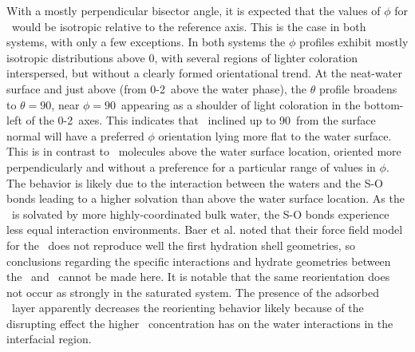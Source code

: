 
 With a mostly perpendicular bisector angle, it is expected that the values of $\phi$ for \suldiox~would be isotropic relative to the reference axis. This is the case in both systems, with only a few exceptions. In both systems the $\phi$ profiles exhibit mostly isotropic distributions above 0\angs, with several regions of lighter coloration interspersed, but without a clearly formed orientational trend. At the neat-water surface and just above (from 0-2\angs~above the water phase), the $\theta$ profile broadens to $\theta = 90$\textdegree, near $\phi = 90$\textdegree~appearing as a shoulder of light coloration in the bottom-left of the 0-2\angs~axes. This indicates that \suldiox~inclined up to 90\textdegree~from the surface normal will have a preferred $\phi$ orientation lying more flat to the water surface. This is in contrast to \suldiox~molecules above the water surface location, oriented more perpendicularly and without a preference for a particular range of values in $\phi$. The behavior is likely due to the interaction between the waters and the S-O bonds leading to a higher solvation than above the water surface location. As the \suldiox~is solvated by more highly-coordinated bulk water, the S-O bonds experience less equal interaction environments. Baer et al. noted that their force field model for the \suldiox~does not reproduce well the first hydration shell geometries,\cite{Baer2010} so conclusions regarding the specific interactions and hydrate geometries between the \suldiox~and \wat~cannot be made here. It is notable that the same reorientation does not occur as strongly in the saturated system. The presence of the adsorbed \suldiox~layer apparently decreases the reorienting behavior likely because of the disrupting effect the higher \suldiox~concentration has on the water interactions in the interfacial region. %


